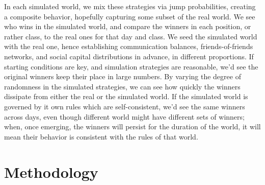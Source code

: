 \documentclass[10pt,oneside]{memoir}
\begin{document}
In each simulated world, we mix these strategies via jump probabilities, creating a composite behavior, hopefully capturing some subset of the real world.  We see who wins in the simulated world, and compare the winners in each position, or rather class, to the real ones for that day and class.  We seed the simulated world with the real one, hence establishing communication balances, friends-of-friends networks, and social capital distributions in advance, in different proportions.  If starting conditions are key, and simulation strategies are reasonable, we'd see the original winners keep their place in large numbers.  By varying the degree of randomness in the simulated strategies, we can see how quickly the winners dissipate from either the real or the simulated world.  If the simulated world is governed by it own rules which are self-consistent, we'd see the same winners across days, even though different world might have different sets of winners; when, once emerging, the winners will persist for the duration of the world, it will mean their behavior is consistent with the rules of that world.


\section{Methodology}
\label{methodology}
\end{document}
